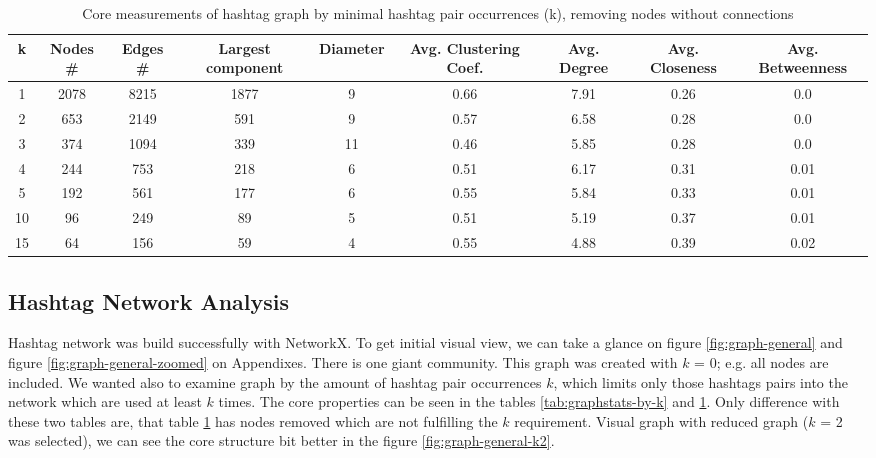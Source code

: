 \documentclass[conference]{IEEEtran}
\begin{document}
    \begin{table}[ht]
        \begin{tabular} { | c | c | c | c | c | c | c | c | c | }
            \hline
            k & Nodes \# & Edges \# & Largest component & Diameter & Avg. Clustering Coef. & Avg. Degree
            & Avg. Closeness
            & Avg. Betweenness
            \\
            \hline
            1  & 2078 & 8215 & 1877 & 9  & 0.66 & 7.91 & 0.26 & 0.0  \\
            \hline
            2  & 653  & 2149 & 591  & 9  & 0.57 & 6.58 & 0.28 & 0.0  \\
            \hline
            3  & 374  & 1094 & 339  & 11 & 0.46 & 5.85 & 0.28 & 0.0  \\
            \hline
            4  & 244  & 753  & 218  & 6  & 0.51 & 6.17 & 0.31 & 0.01 \\
            \hline
            5  & 192  & 561  & 177  & 6  & 0.55 & 5.84 & 0.33 & 0.01 \\
            \hline
            10 & 96   & 249  & 89   & 5  & 0.51 & 5.19 & 0.37 & 0.01 \\
            \hline
            15 & 64   & 156  & 59   & 4  & 0.55 & 4.88 & 0.39 & 0.02 \\
            \hline

        \end{tabular}
        \caption {Core measurements of hashtag graph by minimal hashtag pair occurrences (k), removing nodes without connections}
        \label {tab:graphstats-by-k-no-connect}
    \end{table}

    \subsection{Hashtag Network Analysis}

    Hashtag network was build successfully with NetworkX.
    To get initial visual view, we can take a glance on figure \ref{fig:graph-general} and figure \ref{fig:graph-general-zoomed} on Appendixes.
    There is one giant community.
    This graph was created with $k$ = 0; e.g. all nodes are included.
    We wanted also to examine graph by the amount of hashtag pair occurrences $k$, which limits only those hashtags pairs into the network
    which are used at least $k$ times.
    The core properties can be seen in the tables \ref{tab:graphstats-by-k} and \ref{tab:graphstats-by-k-no-connect}.
    Only difference with these two tables are, that table \ref{tab:graphstats-by-k-no-connect} has nodes removed which are not
    fulfilling the $k$ requirement.
    Visual graph with reduced graph ($k$ = 2 was selected), we can see the core structure bit better in the figure \ref{fig:graph-general-k2}.
\end{document}
